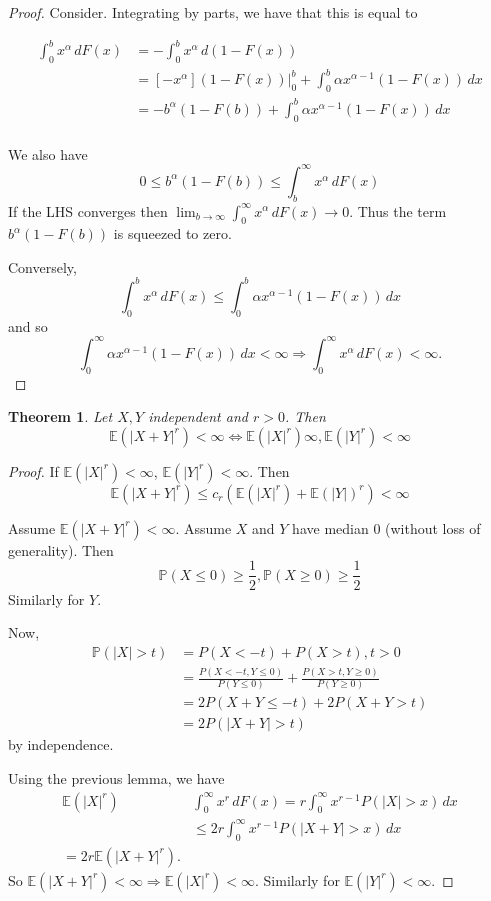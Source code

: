 \documentclass[10pt, oneside, reqno]{amsart}
\theoremstyle{plain}%
\newtheorem{thm}{Theorem}[section]
\theoremstyle{definition}
\theoremstyle{remark}
\newcommand{\E}{\mathbb{E}}
\renewcommand{\P}{\mathbb{P}}
\begin{document}
\begin{proof}
    Consider.  Integrating by parts, we have that this is equal to 

\begin{align*}
    \int_0^b x^{\alpha} \, dF(x) &= -\int_0^b x^\alpha \, d(1-F(x)) \\
                            &= [-x^\alpha] (1-F(x))|_0^b + \int_0^b \alpha x^{\alpha - 1} (1 - F(x)) \, dx \\
                            &= -b^{\alpha}(1-F(b)) + \int_0^b \alpha x^{\alpha - 1} (1 - F(x)) \, dx  \\
\end{align*}

We also have \[
    0 \leq b^\alpha (1-F(b)) \leq \int_b^\infty x^\alpha \, dF(x)
\]
If the LHS converges then $\lim_{b \rightarrow \infty} \int_0^\infty x^\alpha \, dF(x) \rightarrow 0$.  Thus the term $b^\alpha (1-F(b))$ is squeezed to zero.

Conversely, \[
    \int_0^b x^\alpha \, dF(x) \leq \int_0^b \alpha x^{\alpha - 1} (1-F(x)) \, dx
\] and so \[
    \int_0^\infty \alpha x^{\alpha - 1} (1-F(x)) \, dx < \infty \Rightarrow \int_0^\infty x^\alpha \, dF(x) < \infty.
\]
\end{proof}

\begin{thm}
    Let $X,Y$ independent and $r > 0$. Then \[
        \E( |X+Y|^r) <\infty  \iff \E(|X|^r) \infty, \E(|Y|^r) < \infty
    \] 
\end{thm}

\begin{proof}
    If $\E(|X|^r) < \infty$, $\E(|Y|^r) < \infty$.  Then \[
        \E(|X+Y|^r) \leq c_r (\E(|X|^r) + \E(|Y|)^r ) < \infty
    \]
    
    Assume $\E(|X+Y|^r) < \infty$.  Assume $X$ and $Y$ have median 0 (without loss of generality).  Then \[
        \P(X \leq 0) \geq \frac{1}{2}, \P(X \geq 0) \geq \frac{1}{2}
    \] Similarly for $Y$. 
    
    Now, \begin{align*}
        \P(|X| > t) &= P(X < -t) + P( X > t), t > 0 \\
                    &= \frac{P(X  < -t, Y \leq 0)}{P(Y \leq 0)} + \frac{P(X > t, Y \geq 0)}{P(Y \geq 0)} \\
                    &= 2 P(X+Y \leq -t) + 2 P(X+Y > t) \\
                    &= 2 P(|X+Y| > t)
    \end{align*} by independence.
    
    Using the previous lemma, we have \begin{align*}
        \E(|X|^r) & \int_0^\infty x^r \, dF(x) = r \int_0^\infty x^{r-1} P(|X| > x) \, dx \\
                            &\leq 2r \int_0^\infty x^{r-1} P(|X+Y| > x) \, dx \\
                            = 2r \E(|X+Y|^r).
    \end{align*}  So $\E(|X+Y|^r) < \infty \Rightarrow \E(|X|^r) < \infty$.  Similarly for $\E(|Y|^r) < \infty$.  

\end{proof}
\end{document}
